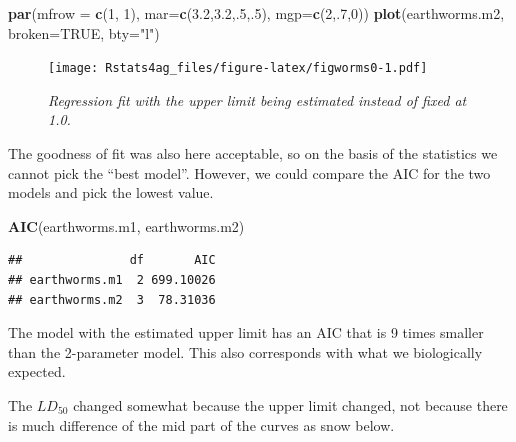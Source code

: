 \documentclass[letterpaper,]{book}
\newenvironment{Shaded}{\begin{snugshade}}{\end{snugshade}}
\newcommand{\DataTypeTok}[1]{\textcolor[rgb]{0.13,0.29,0.53}{#1}}
\newcommand{\DecValTok}[1]{\textcolor[rgb]{0.00,0.00,0.81}{#1}}
\newcommand{\FloatTok}[1]{\textcolor[rgb]{0.00,0.00,0.81}{#1}}
\newcommand{\KeywordTok}[1]{\textcolor[rgb]{0.13,0.29,0.53}{\textbf{#1}}}
\newcommand{\NormalTok}[1]{#1}
\newcommand{\OtherTok}[1]{\textcolor[rgb]{0.56,0.35,0.01}{#1}}
\newcommand{\StringTok}[1]{\textcolor[rgb]{0.31,0.60,0.02}{#1}}
\begin{document}
\begin{Shaded}
\begin{Highlighting}[]
\KeywordTok{par}\NormalTok{(}\DataTypeTok{mfrow =} \KeywordTok{c}\NormalTok{(}\DecValTok{1}\NormalTok{, }\DecValTok{1}\NormalTok{), }\DataTypeTok{mar=}\KeywordTok{c}\NormalTok{(}\FloatTok{3.2}\NormalTok{,}\FloatTok{3.2}\NormalTok{,.}\DecValTok{5}\NormalTok{,.}\DecValTok{5}\NormalTok{), }\DataTypeTok{mgp=}\KeywordTok{c}\NormalTok{(}\DecValTok{2}\NormalTok{,.}\DecValTok{7}\NormalTok{,}\DecValTok{0}\NormalTok{))}
\KeywordTok{plot}\NormalTok{(earthworms.m2, }\DataTypeTok{broken=}\OtherTok{TRUE}\NormalTok{, }\DataTypeTok{bty=}\StringTok{"l"}\NormalTok{)}
\end{Highlighting}
\end{Shaded}

\begin{figure}
\centering
\texttt{[image: Rstats4ag\_files/figure-latex/figworms0-1.pdf]}
\caption{\label{fig:figworms0}\emph{Regression fit with the upper limit being estimated instead of fixed at 1.0.}}
\end{figure}

The goodness of fit was also here acceptable, so on the basis of the statistics we cannot pick the ``best model''. However, we could compare the AIC for the two models and pick the lowest value.

\begin{Shaded}
\begin{Highlighting}[]
\KeywordTok{AIC}\NormalTok{(earthworms.m1, earthworms.m2)}
\end{Highlighting}
\end{Shaded}

\begin{verbatim}
##               df       AIC
## earthworms.m1  2 699.10026
## earthworms.m2  3  78.31036
\end{verbatim}

The model with the estimated upper limit has an AIC that is 9 times smaller than the 2-parameter model. This also corresponds with what we biologically expected.

The \(LD_{50}\) changed somewhat because the upper limit changed, not because there is much difference of the mid part of the curves as snow below.
\end{document}

